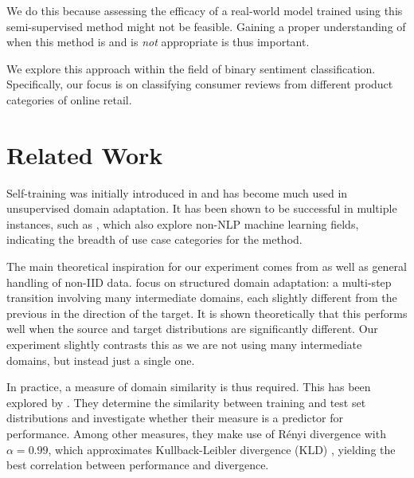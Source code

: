 \documentclass[11pt,a4paper]{article}
\begin{document}
We do this because assessing the efficacy of a real-world model trained using this semi-supervised method might not be feasible.
Gaining a proper understanding of when this method is and is \textit{not} appropriate is thus important.

We explore this approach within the field of binary sentiment classification. Specifically, our focus is on classifying consumer reviews from different product categories of online retail.



\section*{Related Work}
Self-training was initially introduced in \cite{yarowsky1995unsupervised} and has become much used in unsupervised domain adaptation. It has been shown to be successful in multiple instances, such as \cite{phoo2020self,zou2018unsupervised}, which also explore non-NLP machine learning fields, indicating the breadth of use case categories for the method.


The main theoretical inspiration for our experiment comes from \cite{kumar2020understanding} as well as general handling of non-IID data.
\citet{kumar2020understanding} focus on structured domain adaptation: a multi-step transition involving many intermediate domains, each slightly different from the previous in the direction of the target.
It is shown theoretically that this performs well when the source and target distributions are significantly different.
Our experiment slightly contrasts this as we are not using many intermediate domains, but instead just a single one.

In practice, a measure of domain similarity is thus required. This has been explored by \cite{van-asch-daelemans-2010-using}.
They determine the similarity between training and test set distributions and investigate whether their measure is a predictor for performance. Among other measures, they make use of Rényi divergence with $\alpha=0.99$, which approximates Kullback-Leibler divergence (KLD) \cite{kullback1951information}, yielding the best correlation between performance and divergence.
\end{document}
